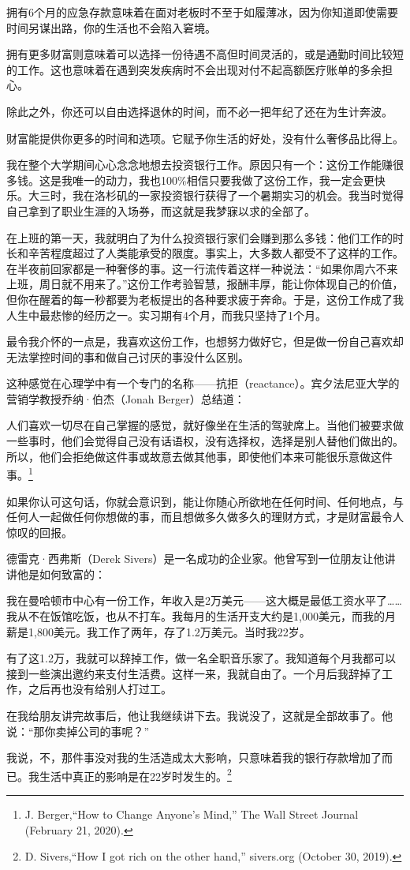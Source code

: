 拥有6个月的应急存款意味着在面对老板时不至于如履薄冰，因为你知道即使需要时间另谋出路，你的生活也不会陷入窘境。

拥有更多财富则意味着可以选择一份待遇不高但时间灵活的，或是通勤时间比较短的工作。这也意味着在遇到突发疾病时不会出现对付不起高额医疗账单的多余担心。

除此之外，你还可以自由选择退休的时间，而不必一把年纪了还在为生计奔波。

财富能提供你更多的时间和选项。它赋予你生活的好处，没有什么奢侈品比得上。

我在整个大学期间心心念念地想去投资银行工作。原因只有一个：这份工作能赚很多钱。这是我唯一的动力，我也100\%相信只要我做了这份工作，我一定会更快乐。大三时，我在洛杉矶的一家投资银行获得了一个暑期实习的机会。我当时觉得自己拿到了职业生涯的入场券，而这就是我梦寐以求的全部了。

在上班的第一天，我就明白了为什么投资银行家们会赚到那么多钱：他们工作的时长和辛苦程度超过了人类能承受的限度。事实上，大多数人都受不了这样的工作。在半夜前回家都是一种奢侈的事。这一行流传着这样一种说法：“如果你周六不来上班，周日就不用来了。”这份工作考验智慧，报酬丰厚，能让你体现自己的价值，但你在醒着的每一秒都要为老板提出的各种要求疲于奔命。于是，这份工作成了我人生中最悲惨的经历之一。实习期有4个月，而我只坚持了1个月。

最令我介怀的一点是，我喜欢这份工作，也想努力做好它，但是做一份自己喜欢却无法掌控时间的事和做自己讨厌的事没什么区别。

这种感觉在心理学中有一个专门的名称——抗拒（reactance）。宾夕法尼亚大学的营销学教授乔纳·伯杰（Jonah Berger）总结道：

{\kaishu

人们喜欢一切尽在自己掌握的感觉，就好像坐在生活的驾驶席上。当他们被要求做一些事时，他们会觉得自己没有话语权，没有选择权，选择是别人替他们做出的。所以，他们会拒绝做这件事或故意去做其他事，即使他们本来可能很乐意做这件事。\footnote{J. Berger,“How to Change Anyone’s Mind,” The Wall Street Journal (February 21, 2020).}

}

如果你认可这句话，你就会意识到，能让你随心所欲地在任何时间、任何地点，与任何人一起做任何你想做的事，而且想做多久做多久的理财方式，才是财富最令人惊叹的回报。

德雷克·西弗斯（Derek Sivers）是一名成功的企业家。他曾写到一位朋友让他讲讲他是如何致富的：

{\kaishu

我在曼哈顿市中心有一份工作，年收入是2万美元——这大概是最低工资水平了……我从不在饭馆吃饭，也从不打车。我每月的生活开支大约是1,000美元，而我的月薪是1,800美元。我工作了两年，存了1.2万美元。当时我22岁。

有了这1.2万，我就可以辞掉工作，做一名全职音乐家了。我知道每个月我都可以接到一些演出邀约来支付生活费。这样一来，我就自由了。一个月后我辞掉了工作，之后再也没有给别人打过工。

在我给朋友讲完故事后，他让我继续讲下去。我说没了，这就是全部故事了。他说：“那你卖掉公司的事呢？”

我说，不，那件事没对我的生活造成太大影响，只意味着我的银行存款增加了而已。我生活中真正的影响是在22岁时发生的。\footnote{D. Sivers,“How I got rich on the other hand,” sivers.org (October 30, 2019).}

}

